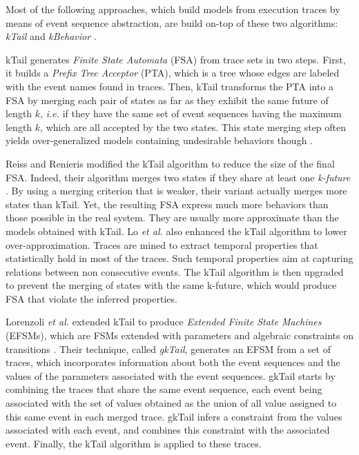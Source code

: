 Most of the following approaches, which build models from
execution traces by means of event sequence abstraction, are
build on-top of these two algorithms: \textit{kTail}
\cite{5009015} and \textit{kBehavior} \cite{mariani2007dynamic}.

kTail generates \textit{Finite State Automata} (FSA) from trace
sets in two steps. First, it builds a \textit{Prefix Tree
Acceptor} (PTA), which is a tree whose edges are labeled with
the event names found in traces. Then, kTail transforms the PTA
into a FSA by merging each pair of states as far as they exhibit
the same future of length $k$, \emph{i.e.} if they have the same set of
event sequences having the maximum length $k$, which are all
accepted by the two states. This state merging step often yields
over-generalized models containing undesirable behaviors though
\cite{4023976}.

Reiss and Renieris modified the kTail algorithm to reduce the
size of the final FSA.  Indeed, their algorithm merges two states
if they share at least one \textit{k-future} \cite{919096}. By
using a merging criterion that is weaker, their variant actually
merges more states than kTail. Yet, the resulting FSA
express much more behaviors than those possible in the real
system. They are usually more approximate than the models
obtained with kTail. Lo \emph{et al.} \cite{Lo:2009:ASB:1595696.1595761}
also enhanced the kTail algorithm to lower over-approximation.
Traces are mined to extract temporal properties that
statistically hold in most of the traces. Such temporal
properties aim at capturing relations between non consecutive
events. The kTail algorithm is then upgraded to prevent the
merging of states with the same k-future, which would produce FSA
that violate the inferred properties.

Lorenzoli \emph{et al.} extended kTail to produce \textit{Extended
Finite State Machines} (EFSMs), which are FSMs extended with
parameters and algebraic constraints on transitions
\cite{Lorenzoli2008}. Their technique, called \textit{gkTail},
generates an EFSM from a set of traces, which incorporates
information about both the event sequences and the values of the
parameters associated with the event sequences. gkTail starts by
combining the traces that share the same event sequence, each
event being associated with the set of values obtained as the
union of all value assigned to this same event in each merged
trace. gkTail infers a constraint from the values associated with
each event, and combines this constraint with the associated
event. Finally, the kTail algorithm is applied to these traces.

